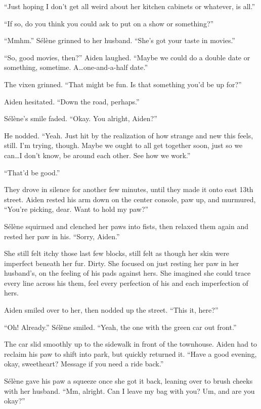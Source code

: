 ``Just hoping I don't get all weird about her kitchen cabinets or whatever, is all.''

``If so, do you think you could ask to put on a show or something?''

``Mmhm.'' Sélène grinned to her husband. ``She's got your taste in movies.''

``So, good movies, then?'' Aiden laughed. ``Maybe we could do a double date or something, sometime. A\ldots{}one-and-a-half date.''

The vixen grinned. ``That might be fun. Is that something you'd be up for?''

Aiden hesitated. ``Down the road, perhaps.''

Sélène's smile faded. ``Okay. You alright, Aiden?''

He nodded. ``Yeah. Just hit by the realization of how strange and new this feels, still. I'm trying, though. Maybe we ought to all get together soon, just so we can\ldots{}I don't know, be around each other. See how we work.''

``That'd be good.''

They drove in silence for another few minutes, until they made it onto east 13th street. Aiden rested his arm down on the center console, paw up, and murmured, ``You're picking, dear. Want to hold my paw?''

Sélène squirmed and clenched her paws into fists, then relaxed them again and rested her paw in his. ``Sorry, Aiden.''

She still felt itchy those last few blocks, still felt as though her skin were imperfect beneath her fur. Dirty. She focused on just resting her paw in her husband's, on the feeling of his pads against hers. She imagined she could trace every line across his them, feel every perfection of his and each imperfection of hers.

Aiden smiled over to her, then nodded up the street. ``This it, here?''

``Oh! Already.'' Sélène smiled. ``Yeah, the one with the green car out front.''

The car slid smoothly up to the sidewalk in front of the townhouse. Aiden had to reclaim his paw to shift into park, but quickly returned it. ``Have a good evening, okay, sweetheart? Message if you need a ride back.''

Sélène gave his paw a squeeze once she got it back, leaning over to brush cheeks with her husband. ``Mm, alright. Can I leave my bag with you? Um, and are you okay?''

